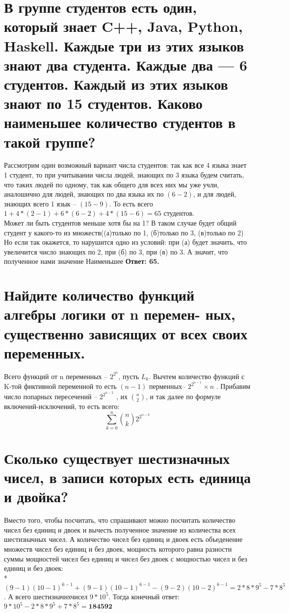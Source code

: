 \documentclass[a4paper,11pt]{article}
\begin{document}
\section{В группе студентов есть один, который знает C++, Java, Python,
Haskell. Каждые три из этих языков знают два студента. Каждые два —
6 студентов. Каждый из этих языков знают по 15 студентов. Каково
наименьшее количество студентов в такой группе?}
Рассмотрим один возможный вариант числа студентов: так как все 4 языка знает 1 студент, то при учитывании числа людей, знающих по 3 языка будем считать, что таких людей по одному, так как общего для всех них мы уже учли, аналошично для людей, знающих по два языка их по $(6-2)$, и для людей, знающих всего 1 язык -- $(15-9)$. То есть всего $1 + 4*(2-1) + 6*(6-2) + 4*(15 - 6) = 65 $ студентов.\\ Может ли быть студентов меньше хотя бы на 1? В таком случае будет общий студент у какого-то из множеств((а)только по 1, (б)только по 3, (в)только по 2) Но если так окажется,  то нарушится одно из условий:
при (а) будет значить, что увеличится число знающих по 2, при (б) по 3, при (в) по 3. А значит, что полученное нами значение Наименьшее
\textbf{Ответ: 65.}


\section{Найдите количество функций алгебры логики от n перемен-
ных, существенно зависящих от всех своих переменных.}

Всего функций от n переменных -- $2^{2^n}$, пусть $L_k$. Вычтем количество функций с K-той фиктивной переменной то есть $(n-1)$ перменных-- $2^{2^{n-1}} \times n$ . Прибавим число попарных пересечений -- $2^{2^{n-2}}$ , их ${n \choose 2}$, и так далее по формуле включений-исключений, то есть всего: \[ \sum\limits_{k=0}^{n}{n \choose k} 2^{2^{n-k}} \]




\section{Сколько существует шестизначных чисел, в записи которых
есть единица и двойка?}

Вместо того, чтобы посчитать, что спрашивают можно посчитать количество чисел без единиц и двоек и вычесть полученное значение из количества всех шестизначных чисел. А количество чисел без единиц и двоек есть объеденение множеств чисел без единиц и без двоек, мощность которого равна разности суммы мощностей чисел без единиц и чисел без двоек с мощностью чисел и без единиц и без двоек:\\* $ (9-1)(10-1)^{6-1} + (9-1)(10-1)^{6-1} - (9-2)(10-2)^{6-1} = 2*8*9^5-7*8^5$. А всего шестизначнхчисел $9*10^5$. Тогда конечный ответ: $ 9*10^5 - 2*8*9^5+7*8^5 = \textbf{184592}$
\end{document}
